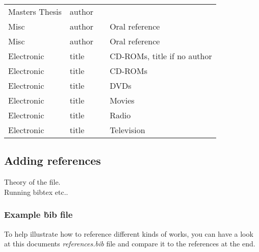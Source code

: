 \begin{table}[h]
\begin{tabular}{l l l l}
Masters Thesis & author & \citet{yf07} \\
Misc           & author & \citet{es01}     & Oral reference \\
Misc           & author & \citet{ks08}     & Oral reference \\
Electronic     & title  & \citet{ea05}     & CD-ROMs, title if no author \\
Electronic     & title  & \citet{ns03}     & CD-ROMs\\
Electronic     & title  & \citet{jp05}     & DVDs\\
Electronic     & title  & \citet{ssh04}    & Movies\\
Electronic     & title  & \citet{fapp09}   & Radio\\
Electronic     & title  & \citet{kn09}     & Television\\
\end{tabular}
\end{table}

\subsection{Adding references}

Theory of the file. \\
Running bibtex etc..

\subsubsection{Example \.bib file}

\citet{ea05} To help illustrate how to reference different kinds of works, you can have a
look at this documents \emph{references.bib} file and compare it to the
references at the end.

